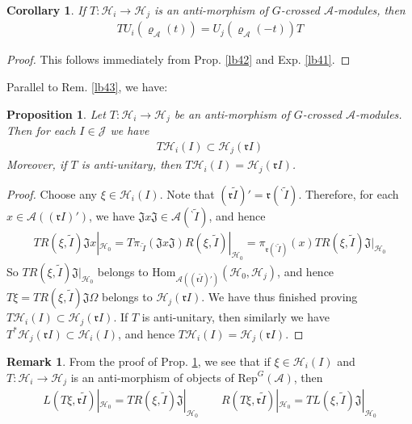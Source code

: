 \documentclass[11pt,b5paper,notitlepage]{article}
\theoremstyle{definition}
\newtheorem{rem}[df]{Remark}
\theoremstyle{plain}
\newtheorem{pp}[df]{Proposition}
\newtheorem{co}[df]{Corollary}
\newcommand{\fk}{\mathfrak}
\newcommand{\wtd}{\widetilde}
\newcommand{\Hom}{\mathrm{Hom}}
\newcommand{\RepGA}{\mathrm{Rep}^G(\mathcal A)}
\newcommand{\bpr}{{}^\backprime}
\newcommand{\rk}{\mathfrak r}
\newcommand{\MA}{\mathcal A}
\newcommand{\MH}{\mathcal H}
\newcommand{\MJ}{\mathcal J}
\numberwithin{equation}{section}
\begin{document}
\begin{co}\label{lb84}
If $T:\MH_i\rightarrow\MH_j$ is an anti-morphism of $G$-crossed $\MA$-modules, then
\begin{align*}
TU_i(\varrho_\MA(t))=U_j(\varrho_\MA(-t))T
\end{align*}
\end{co}


\begin{proof}
This follows immediately from Prop. \ref{lb42} and Exp. \ref{lb41}.
\end{proof}



Parallel to Rem. \ref{lb43}, we have:
\begin{pp}\label{lb44}
Let $T:\MH_i\rightarrow\MH_j$ be an anti-morphism of $G$-crossed $\MA$-modules. Then for each $I\in\MJ$ we have
\begin{align*}
T\MH_i(I)\subset\MH_j(\rk I)
\end{align*}
Moreover, if $T$ is anti-unitary, then $T\MH_i(I)=\MH_j(\rk I)$.
\end{pp}

\begin{proof}
Choose any $\xi\in\MH_i(I)$. Note that $(\rk\wtd I)'=\rk(\bpr\wtd I)$. Therefore, for each $x\in\MA((\rk I)')$, we have $\fk Jx\fk J\in\MA(\bpr\wtd I)$, and hence
\begin{align*}
TR(\xi,\wtd I)\fk Jx|_{\MH_0}=T\pi_{\bpr\wtd I}(\fk Jx\fk J)R(\xi,\wtd I)|_{\MH_0}=\pi_{\rk(\bpr\wtd I)}(x)TR(\xi,\wtd I)\fk J|_{\MH_0}
\end{align*}
So $TR(\xi,\wtd I)\fk J|_{\MH_0}$ belongs to $\Hom_{\MA((\rk\wtd I)')}(\MH_0,\MH_j)$, and hence $T\xi=TR(\xi,\wtd I)\fk J\Omega$ belongs to $\MH_j(\rk I)$. We have thus finished proving $T\MH_i(I)\subset\MH_j(\rk I)$. If $T$ is anti-unitary, then similarly we have $T^*\MH_j(\rk I)\subset\MH_i(I)$, and hence $T\MH_i(I)=\MH_j(\rk I)$.
\end{proof}

\begin{rem}\label{lb45}
From the proof of Prop. \ref{lb44}, we see that if $\xi\in\MH_i(I)$ and $T:\MH_i\rightarrow\MH_j$ is an anti-morphism of objects of $\RepGA$, then
\begin{align*}
L(T\xi,\rk\wtd I)|_{\MH_0}=TR(\xi,\wtd I)\fk J|_{\MH_0}\qquad R(T\xi,\rk\wtd I)|_{\MH_0}=TL(\xi,\wtd I)\fk J|_{\MH_0}
\end{align*}
\end{rem}
\end{document}
